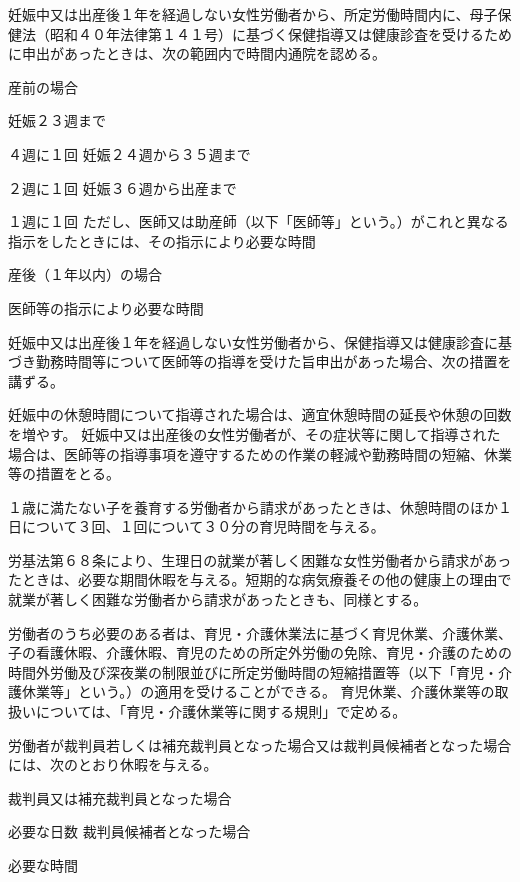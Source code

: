 \documentclass[10pt,a4paper,uplatex]{jsarticle}
\begin{document}
妊娠中又は出産後１年を経過しない女性労働者から、所定労働時間内に、母子保健法（昭和４０年法律第１４１号）に基づく保健指導又は健康診査を受けるために申出があったときは、次の範囲内で時間内通院を認める。
\begin{enumerate}
    \itm 産前の場合
    \begin{enumerate}
        \itm 妊娠２３週まで\par ４週に１回
        \itm 妊娠２４週から３５週まで\par ２週に１回
        \itm 妊娠３６週から出産まで\par １週に１回
        \itm ただし、医師又は助産師（以下「医師等」という。）がこれと異なる指示をしたときには、その指示により必要な時間
    \end{enumerate}
    \itm 産後（１年以内）の場合
    \begin{enumerate}
        \itm 医師等の指示により必要な時間
    \end{enumerate}
\end{enumerate}

\term
妊娠中又は出産後１年を経過しない女性労働者から、保健指導又は健康診査に基づき勤務時間等について医師等の指導を受けた旨申出があった場合、次の措置を講ずる。
\begin{enumerate}
    \itm 妊娠中の休憩時間について指導された場合は、適宜休憩時間の延長や休憩の回数を増やす。
    \itm 妊娠中又は出産後の女性労働者が、その症状等に関して指導された場合は、医師等の指導事項を遵守するための作業の軽減や勤務時間の短縮、休業等の措置をとる。
\end{enumerate}

１歳に満たない子を養育する労働者から請求があったときは、休憩時間のほか１日について３回、１回について３０分の育児時間を与える。

労基法第６８条により、生理日の就業が著しく困難な女性労働者から請求があったときは、必要な期間休暇を与える。短期的な病気療養その他の健康上の理由で就業が著しく困難な労働者から請求があったときも、同様とする。

労働者のうち必要のある者は、育児・介護休業法に基づく育児休業、介護休業、子の看護休暇、介護休暇、育児のための所定外労働の免除、育児・介護のための時間外労働及び深夜業の制限並びに所定労働時間の短縮措置等（以下「育児・介護休業等」という。）の適用を受けることができる。
\term
育児休業、介護休業等の取扱いについては、「育児・介護休業等に関する規則」で定める。

労働者が裁判員若しくは補充裁判員となった場合又は裁判員候補者となった場合には、次のとおり休暇を与える。
\begin{enumerate}
    \itm 裁判員又は補充裁判員となった場合 \par 必要な日数
    \itm 裁判員候補者となった場合\par 必要な時間
\end{enumerate}
\end{document}
